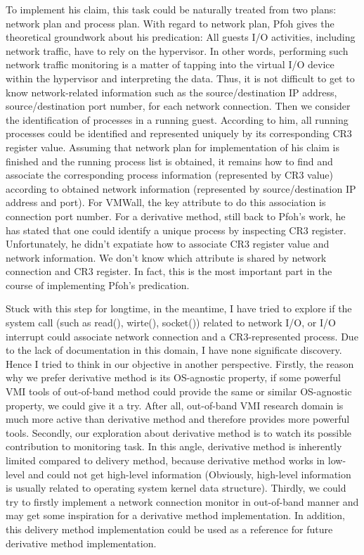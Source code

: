 To implement his claim, this task could be naturally treated from two plans: network plan and process plan. 
With regard to network plan, Pfoh gives the theoretical groundwork about his predication: All guests I/O activities, 
including network traffic, have to rely on the hypervisor. In other words, performing such network traffic monitoring is a 
matter of tapping into the virtual I/O device within the hypervisor and interpreting the data. Thus, it is not difficult 
to get to know network-related information such as the source/destination IP address, source/destination port number, 
for each network connection. Then we consider the identification of processes in a running guest. According to him, all 
running processes could be identified and represented uniquely by its corresponding CR3 register value. Assuming that 
network plan for implementation of his claim is finished and the running process list is obtained, it remains how to find 
and associate the corresponding process information (represented by CR3 value) according to obtained network information 
(represented by source/destination IP address and port). For VMWall, the key attribute to do this association is connection
port number. For a derivative method, still back to Pfoh’s work, he has stated that one could identify a unique process by 
inspecting CR3 register. Unfortunately, he didn’t expatiate how to associate CR3 register value and network information. 
We don’t know which attribute is shared by network connection and CR3 register. In fact, this is the most important part in 
the course of implementing Pfoh’s predication.

Stuck with this step for longtime, in the meantime, I have tried to explore if the system call (such as read(), wirte(), 
socket()) related to network I/O, or I/O interrupt could associate network connection and a CR3-represented process. 
Due to the lack of documentation in this domain, I have none significate discovery. Hence I tried to think in our objective
in another perspective. Firstly, the reason why we prefer derivative method is its OS-agnostic property, if some powerful 
VMI tools of out-of-band method could provide the same or similar OS-agnostic property, we could give it a try. After all, 
out-of-band VMI research domain is much more active than derivative method and therefore provides more powerful tools. 
Secondly, our exploration about derivative method is to watch its possible contribution to monitoring task. In this angle, 
derivative method is inherently limited compared to delivery method, because derivative method works in low-level and could
not get high-level information (Obviously, high-level information is usually related to operating system kernel data 
structure). Thirdly, we could try to firstly implement a network connection monitor in out-of-band manner and may get some 
inspiration for a derivative method implementation. In addition, this delivery method implementation could be used as a 
reference for future derivative method implementation.

